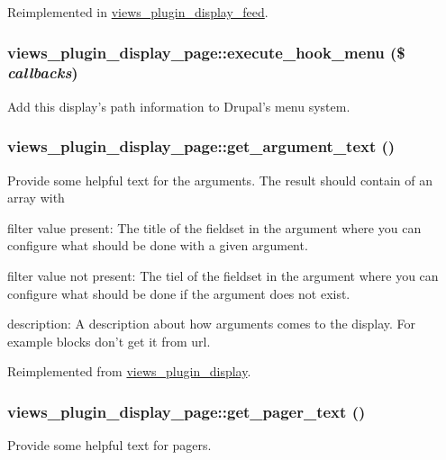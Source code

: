 Reimplemented in \hyperlink{classviews__plugin__display__feed_a6bfa566313f3f8fba85751554567e2dd}{views\_\-plugin\_\-display\_\-feed}.\hypertarget{classviews__plugin__display__page_a92137bfe76641bd6c50e7d8b81108b91}{
\subsubsection[{execute\_\-hook\_\-menu}]{\setlength{\rightskip}{0pt plus 5cm}views\_\-plugin\_\-display\_\-page::execute\_\-hook\_\-menu (\$ {\em callbacks})}}
\label{classviews__plugin__display__page_a92137bfe76641bd6c50e7d8b81108b91}
Add this display's path information to Drupal's menu system. \hypertarget{classviews__plugin__display__page_ae3056e57372089c08fb50d85fbfaea49}{
\subsubsection[{get\_\-argument\_\-text}]{\setlength{\rightskip}{0pt plus 5cm}views\_\-plugin\_\-display\_\-page::get\_\-argument\_\-text ()}}
\label{classviews__plugin__display__page_ae3056e57372089c08fb50d85fbfaea49}
Provide some helpful text for the arguments. The result should contain of an array with
\begin{DoxyItemize}
\item filter value present: The title of the fieldset in the argument where you can configure what should be done with a given argument.
\item filter value not present: The tiel of the fieldset in the argument where you can configure what should be done if the argument does not exist.
\item description: A description about how arguments comes to the display. For example blocks don't get it from url. 
\end{DoxyItemize}

Reimplemented from \hyperlink{classviews__plugin__display_a3afbeac02cf2d083014cf64c3e66c290}{views\_\-plugin\_\-display}.\hypertarget{classviews__plugin__display__page_aca620130dea055b599b405845627f3f0}{
\subsubsection[{get\_\-pager\_\-text}]{\setlength{\rightskip}{0pt plus 5cm}views\_\-plugin\_\-display\_\-page::get\_\-pager\_\-text ()}}
\label{classviews__plugin__display__page_aca620130dea055b599b405845627f3f0}
Provide some helpful text for pagers.

